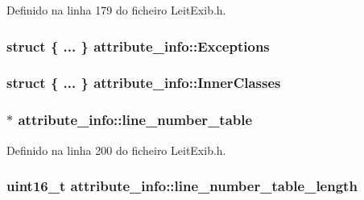 Definido na linha 179 do ficheiro Leit\-Exib.\-h.

\hypertarget{structattribute__info_a4fc210f2d621b426637fb3a32e0783c0}{
\subsubsection[{Exceptions}]{\setlength{\rightskip}{0pt plus 5cm}struct \{ ... \}   attribute\-\_\-info\-::\-Exceptions}}\label{structattribute__info_a4fc210f2d621b426637fb3a32e0783c0}
\hypertarget{structattribute__info_a8b040beab0320ec8804cb3e640127a39}{
\subsubsection[{Inner\-Classes}]{\setlength{\rightskip}{0pt plus 5cm}struct \{ ... \}   attribute\-\_\-info\-::\-Inner\-Classes}}\label{structattribute__info_a8b040beab0320ec8804cb3e640127a39}
\hypertarget{structattribute__info_aa4dba0207d2338202400c3860f5f6cbb}{
\subsubsection[{line\-\_\-number\-\_\-table}]{$\ast$ attribute\-\_\-info\-::line\-\_\-number\-\_\-table}}\label{structattribute__info_aa4dba0207d2338202400c3860f5f6cbb}


Definido na linha 200 do ficheiro Leit\-Exib.\-h.

\hypertarget{structattribute__info_a81109c88e53b847e840ca2672b12700b}{
\subsubsection[{line\-\_\-number\-\_\-table\-\_\-length}]{\setlength{\rightskip}{0pt plus 5cm}uint16\-\_\-t attribute\-\_\-info\-::line\-\_\-number\-\_\-table\-\_\-length}}\label{structattribute__info_a81109c88e53b847e840ca2672b12700b}


